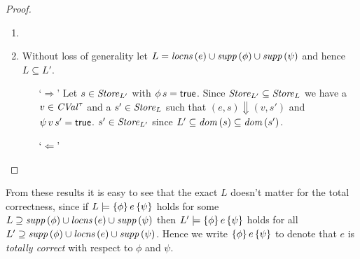 \documentclass[12pt,a4paper]{report}
\newcommand{\CVal}{\nstyle{CVal}}
\begin{document}
\begin{proof} \
  \begin{enumerate}
    \item

    \item Without loss of generality let $L= \mathit{locns}\,(e)\cup\mathit{supp}\,(\phi)\cup\mathit{supp}\,(\psi)$ and hence $L \subseteq L'$.
          \begin{itemize}
            \item[`$\Rightarrow$']
                  Let $s\in\mathit{Store}_{L'}$ with $\phi\,s=\mathsf{true}$. Since $\mathit{Store}_{L'} \subseteq \mathit{Store}_L$ we have
                  a $v\in\CVal^\tau$ and a $s'\in\mathit{Store}_L$ such that $(e,s)\Downarrow(v,s')$ and
                  $\psi\,v\,s'=\mathsf{true}$. $s'\in\mathit{Store}_{L'}$ since $L'\subseteq\mathit{dom}\,(s)\subseteq\mathit{dom}\,(s')$.

            \item[`$\Leftarrow$']
          \end{itemize}
  \end{enumerate}
\end{proof}

From these results it is easy to see that the exact $L$ doesn't matter for the total correctness, since
if $L\models\{\phi\}\,e\,\{\psi\}$ holds for some $L \supseteq \mathit{supp}\,(\phi)\cup\mathit{locns}\,(e)\cup\mathit{supp}\,(\psi)$
then $L'\models\{\phi\}\,e\,\{\psi\}$ holds for all $L'\supseteq \mathit{supp}\,(\phi)\cup\mathit{locns}\,(e)\cup\mathit{supp}\,(\psi)$.
Hence we write $\{\phi\}\,e\,\{\psi\}$ to denote that $e$ is {\em totally correct} with respect to
$\phi$ and $\psi$.
\end{document}
